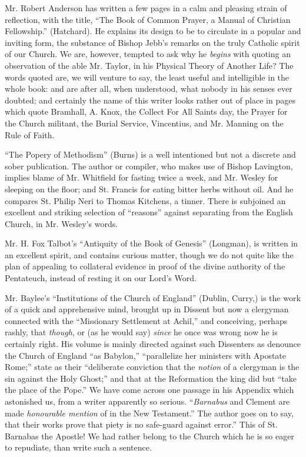 Mr. Robert Anderson has written a few pages in a
calm and pleasing strain of reflection, with the title, ``The Book of
Common Prayer, a Manual of Christian Fellowship.'' (Hatchard). He
explains its design to be to circulate in a popular and inviting form,
the substance of Bishop Jebb's remarks on the truly Catholic spirit of
our Church. We are, however, tempted to ask why he \emph{begins} with
quoting an observation of the able Mr. Taylor, in his Physical Theory of
Another Life? The words quoted are, we will venture to say, the least
useful and intelligible in the whole book: and are after all, when
understood, what nobody in his senses ever doubted; and certainly the
name of this writer looks rather out of place in pages which quote
Bramhall, A. Knox, the Collect For All Saints day, the Prayer for the
Church militant, the Burial Service, Vincentius, and Mr. Manning on the
Rule of Faith.

``The Popery of Methodism'' (Burns) is a well
intentioned but not a discrete and sober publication. The author or
compiler, who makes use of Bishop Lavington, implies blame of Mr.
Whitfield for fasting twice a week, and Mr. Wesley for sleeping on the
floor; and St. Francis for eating bitter herbs without oil. And he
compares St. Philip Neri to Thomas Kitchens, a tinner. There is
subjoined an excellent and striking selection of ``reasons'' against
separating from the English Church, in Mr. Wesley's words.

Mr. H. Fox Talbot's ``Antiquity of the Book of
Genesis'' (Longman), is written in an excellent spirit, and contains
curious matter, though we do not quite like the plan of appealing to
collateral evidence in proof of the divine authority of the Pentateuch,
instead of resting it on our Lord's Word.

Mr. Baylee's ``Institutions of the Church of England''
(Dublin, Curry,) is the work of a quick and apprehensive mind, brought
up in Dissent but now a clergyman connected with the ``Missionary
Settlement at Achil,'' and conceiving, perhaps rashly, that \emph{though},
or (as he would say) \emph{since} he once was wrong now he is certainly
right. His volume is mainly directed against such Dissenters as
denounce the Church of England ``as Babylon,'' ``parallelize her ministers
with Apostate Rome;'' state as their ``deliberate conviction that the \emph{notion}
of a clergyman is the sin against the Holy Ghost;'' and that at the
Reformation the king did but ``take the place of the Pope.'' We have come
across one passage in his Appendix which astonished us, from a writer
apparently so serious. ``\emph{Barnabus} and Clement are made \emph{honourable
mention} of in the New Testament.'' The author goes on to say, that
their works prove that piety is no safe-guard against error.'' This of
St. Barnabas the Apostle! We had rather belong to the Church which he is
so eager to repudiate, than write such a sentence.

